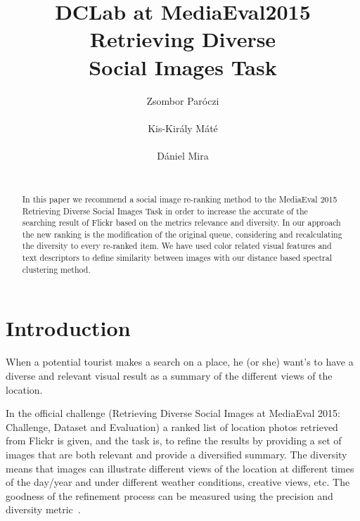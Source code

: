 \documentclass{sig-alternate}
\begin{document}

\title{DCLab at MediaEval2015 Retrieving Diverse \\ Social Images Task}


\author{
\alignauthor
Zsombor Par\'oczi\\
       \\
\alignauthor
Kis-Kir\'aly M\'at\'e \\
		\\
\alignauthor
D\'aniel Mira\\
		\\
}

\maketitle
\begin{abstract}
In this paper we recommend a social image re-ranking method to the MediaEval 2015 Retrieving Diverse Social Images Task in order to increase the accurate of the searching result of Flickr based on the metrics relevance and diversity. In our approach the new ranking is the modification of the original queue, considering and recalculating the diversity to every re-ranked item. We have used color related visual features and text descriptors to define similarity between images with our distance based spectral clustering method.
\end{abstract}

\section{Introduction}

When a potential tourist makes a search on a place, he (or she) want's to have a diverse and relevant visual result as a summary of the different views of the location. 

In the official challenge (Retrieving Diverse Social Images at MediaEval 2015: Challenge, Dataset and Evaluation) \cite{Task2015} a ranked list of location photos retrieved from Flickr is given, and the task is, to refine the results by providing a set of images that are both relevant and provide a diversified summary. The diversity means that images can illustrate different views of the location at different times of the day/year and under different weather conditions, creative views, etc. The goodness of the refinement process can be measured using the precision and diversity metric~\cite{Taneva:2010:GRP:1718487.1718541}. 
\end{document}
